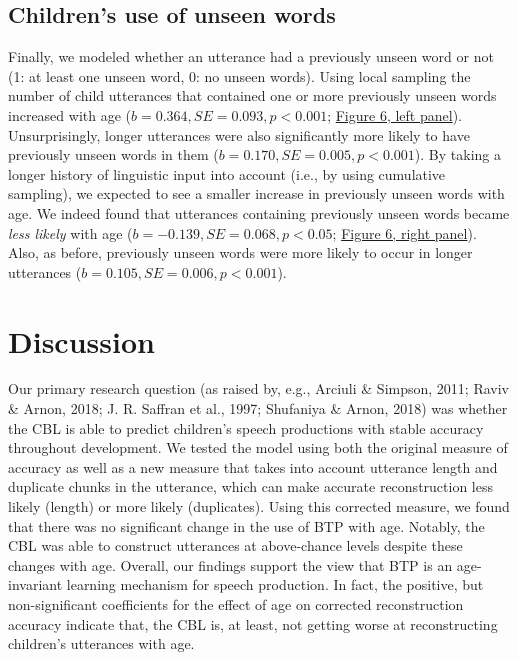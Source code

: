 \documentclass[man,mask,floatsintext]{apa6}
\theoremstyle{definition}
\theoremstyle{definition}
\theoremstyle{definition}
\theoremstyle{remark}
\begin{document}
\subsection{Children's use of unseen
words}\label{childrens-use-of-unseen-words}

Finally, we modeled whether an utterance had a previously unseen word or
not (1: at least one unseen word, 0: no unseen words). Using local
sampling the number of child utterances that contained one or more
previously unseen words increased with age
(\(b = 0.364, SE = 0.093, p < 0.001\); \protect\hyperlink{fig6}{Figure
6, left panel}). Unsurprisingly, longer utterances were also
significantly more likely to have previously unseen words in them
(\(b = 0.170, SE = 0.005, p < 0.001\)). By taking a longer history of
linguistic input into account (i.e., by using cumulative sampling), we
expected to see a smaller increase in previously unseen words with age.
We indeed found that utterances containing previously unseen words
became \emph{less likely} with age
(\(b = -0.139, SE = 0.068, p < 0.05\); \protect\hyperlink{fig6}{Figure
6, right panel}). Also, as before, previously unseen words were more
likely to occur in longer utterances
(\(b = 0.105, SE = 0.006, p < 0.001\)).

\section{Discussion}\label{discussion}

Our primary research question (as raised by, e.g., Arciuli \& Simpson,
2011; Raviv \& Arnon, 2018; J. R. Saffran et al., 1997; Shufaniya \&
Arnon, 2018) was whether the CBL is able to predict children's speech
productions with stable accuracy throughout development. We tested the
model using both the original measure of accuracy as well as a new
measure that takes into account utterance length and duplicate chunks in
the utterance, which can make accurate reconstruction less likely
(length) or more likely (duplicates). Using this corrected measure, we
found that there was no significant change in the use of BTP with age.
Notably, the CBL was able to construct utterances at above-chance levels
despite these changes with age. Overall, our findings support the view
that BTP is an age-invariant learning mechanism for speech production.
In fact, the positive, but non-significant coefficients for the effect
of age on corrected reconstruction accuracy indicate that, the CBL is,
at least, not getting worse at reconstructing children's utterances with
age.
\end{document}
